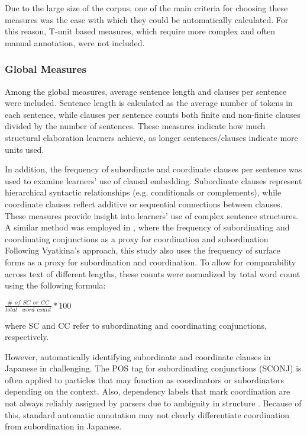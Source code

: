 Due to the large size of the corpus, one of the main criteria for choosing these measures was the ease with which
they could be automatically calculated. For this reason, T-unit based measures, which require more complex and often
manual annotation, were not included.

\subsubsection{Global Measures}
Among the global measures, average sentence length and clauses per sentence were included. Sentence length is
calculated as the average number of tokens in each sentence, while clauses per sentence counts both finite and
non-finite clauses divided by the number of sentences. These measures indicate how much structural elaboration
learners achieve, as longer sentences/clauses indicate more units used.

In addition, the frequency of subordinate and coordinate clauses per sentence was used to examine learners' use of
clausal embedding.
Subordinate clauses represent hierarchical syntactic relationships (e.g. conditionals or complements),
while coordinate clauses reflect additive or sequential connections between clauses. These measures provide insight
into learners'
use of complex sentence structures. A similar method was employed in \citet{Vyatkina2012}, where the frequency of
subordinating and
coordinating conjunctions as a proxy for coordination and subordination
Following Vyatkina's approach, this study also uses the frequency of surface forms as a proxy for subordination and
coordination. To
allow for comparability across text of different lengths, these counts were normalized by total word count using the
following formula:
\begin{center}
${\displaystyle \frac{\# \hspace{5pt} of \hspace{5pt}SC \hspace{5pt}or \hspace{5pt}CC}{total \hspace{5pt} \hspace{
5pt}word \hspace{5pt}count} }  * 100$
\end{center}
where SC and CC refer to subordinating and coordinating conjunctions, respectively.

However, automatically identifying subordinate and coordinate clauses in Japanese in challenging. The POS tag for
subordinating conjunctions (SCONJ) is often applied to particles that may function as coordinators or subordinators
depending on the context. Also, dependency labels that mark coordination are not always reliably assigned by parsers
due to ambiguity in structure \citep{UDJapanese}. Because of this, standard automatic annotation may not clearly
differentiate coordination from subordination in Japanese.


